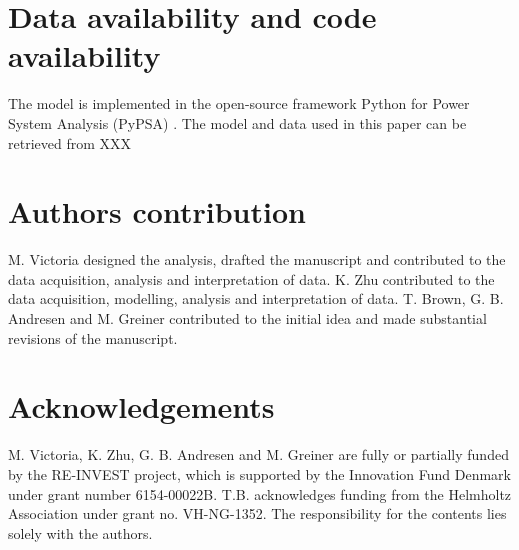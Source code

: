 \documentclass[5p]{elsarticle} %
\begin{document}
\section{Data availability and code availability}

The model is implemented in the open-source framework Python for Power System Analysis (PyPSA) \cite{PyPSA}. The model and data used in this paper can be retrieved from \textcolor[rgb]{1,0,0}{XXX}

\section{Authors contribution}

M. Victoria designed the analysis, drafted the manuscript and contributed to the data acquisition, analysis and interpretation of data. K. Zhu contributed to the data acquisition, modelling, analysis and interpretation of data. 
T. Brown, G. B. Andresen and M. Greiner contributed to the initial idea and made substantial revisions of the manuscript. 

\section{Acknowledgements}
M. Victoria, K. Zhu, G. B. Andresen and M. Greiner are fully or partially funded by the RE-INVEST project, which is supported by  the  Innovation  Fund  Denmark  under  grant  number  6154-00022B. T.B. acknowledges funding from the Helmholtz Association under grant no. VH-NG-1352. The responsibility for the contents lies solely with the authors.


\end{document}
